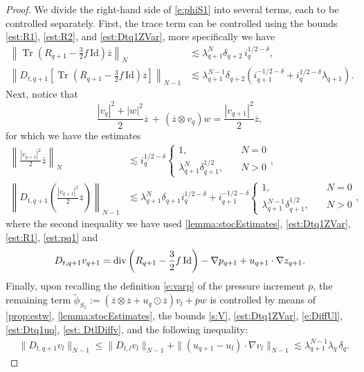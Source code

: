\documentclass[10pt,a4paper]{amsart}
\numberwithin{equation}{section}
\numberwithin{corollario}{section}
\numberwithin{lemma}{section}
\numberwithin{prop}{section}
\theoremstyle{definition}
\theoremstyle{remark}
\newcommand{\dvg}{\mathord{{\rm div}}}
\newcommand{\Id}{\mathrm{Id}}
\newcommand{\varz}{\overline{z}}
\newcommand{\varp}{\overline{p}}
\DeclareMathOperator{\Tr}{Tr}
\newcommand{\qq}{_{q+1}}
\newcommand{\SymOt}{\odot}
\begin{document}
\begin{proof}
We divide the right-hand side of \eqref{e:phiS1} into several terms, each to be controlled separately.
First, the trace term can be controlled using the bounds \eqref{est:R1}, \eqref{est:R2}, and \eqref{est:Dtq1ZVar}, more specifically we have
\begin{align}\label{est:phiS1second}
\left\|\Tr\left(R\qq-\frac32f\,\Id\right)\varz \right\|_N
&\lesssim 
\lambda\qq^N \delta_{q+2}\,i_q^{1/2-\delta},
\\
\left\|D_{t,q+1}\left[\Tr\left(R\qq-\frac32f\,\Id\right)\varz \right]\right\|_{N-1}
&\lesssim \label{est:DphiS1second}
\lambda\qq^{N-1}\delta_{q+2}(i\qq^{-1/2-\delta}+i_q^{1/2-\delta}\lambda\qq).
\end{align}
Next, notice that 
    \begin{equation}
    \frac{|v_q|^2+|w|^2}{2}\varz\,+\, (\varz\otimes v_q)w=\frac{|v\qq|^2}{2}\varz,
    \end{equation}
for which we have the estimates 
    \begin{align}\label{est:phiS1first}
    \left\|\frac{|v\qq|^2}{2}\varz\right\|_N
    &\lesssim 
    i_q^{1/2-\delta}\begin{cases}
        1,\quad &N=0\\
        \lambda\qq^N\delta\qq^{1/2},\quad &N>0
    \end{cases},\\
    \left\|D_{t,q+1}\left(\frac{|v\qq|^2}{2}\varz\right)\right\|_{N-1}
    &\lesssim 
    \lambda\qq^{N}\delta\qq i_q^{1/2-\delta}+ i\qq^{-1/2-\delta}\begin{cases}
        1,\quad &N=0\\
        \lambda\qq^{N-1}\delta\qq^{1/2},\quad &N>0
    \end{cases},
    \end{align}
where the second inequality we have used \autoref{lemma:stocEstimates}, \eqref{est:Dtq1ZVar}, \eqref{est:R1}, \eqref{est:pq1} and 
\[D_{t,q+1}v\qq=\dvg\left(R\qq-\frac{3}{2}f\,\Id\right)-\nabla p\qq+u\qq\cdot \nabla z\qq
.\]
Finally, upon recalling the definition \eqref{e:varp} of the pressure increment $\varp$, the remaining term $\tilde{\phi}_{S_1}:=(\varz\otimes \varz +u_q\SymOt \varz)v_l + \varp w$ is controlled by means of \autoref{prop:estw}, \autoref{lemma:stocEstimates}, the bounds \eqref{s:V}, \eqref{est:Dtq1ZVar}, \eqref{e:DiffUl}, \eqref{est:Dtq1uq}, \eqref{est: DtlDiffv}, and the following inequality:
\begin{align} \label{eq:D_q+1_vl}
    &\|D_{t,q+1}v_l\|_{N-1}\le \|D_{t,l}v_l\|_{N-1}+\|(u\qq-u_l)\cdot\nabla v_l\|_{N-1}\lesssim \lambda\qq^{N-1}\lambda_q\,\delta_q.

\end{align}
\end{proof}
\end{document}
